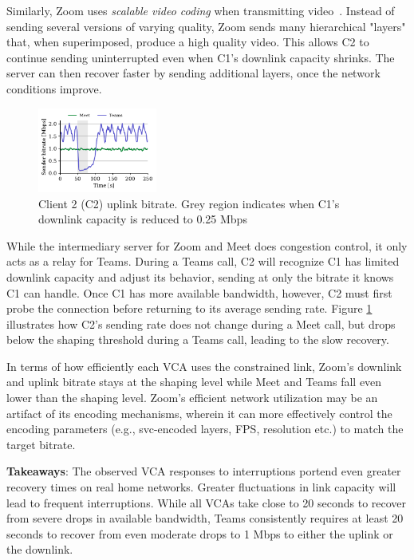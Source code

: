 Similarly, Zoom uses \textit{scalable video coding} when transmitting video~\cite{zoom_encoding}. Instead of sending several versions of varying quality, Zoom sends many hierarchical "layers" that, when superimposed, produce a high quality video. This allows C2 to continue sending uninterrupted even when C1's downlink capacity shrinks. The server can then recover faster by sending additional layers, once the network conditions improve.  

\begin{figure}[t]
    \centering
    \includegraphics[width=0.35\textwidth,keepaspectratio]{../figures/interrupt/Interrupt-sender.pdf}
    \caption{Client 2 (C2) uplink bitrate. Grey region indicates when C1's downlink capacity is reduced to 0.25 Mbps}
    \label{fig:interrupt-sender}
\end{figure}

While the intermediary server for Zoom and Meet does congestion control, it only acts as a relay for Teams. During a Teams call, C2 will recognize C1 has limited downlink capacity and adjust its behavior, sending at only the bitrate it knows C1 can handle. Once C1 has more available bandwidth, however, C2 must first probe the connection before returning to its average sending rate. Figure \ref{fig:interrupt-sender} illustrates how C2's sending rate does not change during a Meet call, but drops below the shaping threshold during a Teams call, leading to the slow recovery.

In terms of how efficiently each VCA uses the constrained link, Zoom's downlink and uplink bitrate stays at the shaping level while Meet and Teams fall even lower than the shaping level. Zoom's efficient network utilization may be an artifact of its encoding mechanisms, wherein it can more effectively control the encoding parameters (e.g., svc-encoded layers, FPS, resolution etc.) to match the target bitrate.  

\noindent \textbf{Takeaways}: The observed VCA responses to interruptions portend even greater recovery times on real home networks. Greater fluctuations in link capacity will lead to frequent interruptions. While all VCAs take close to 20 seconds to recover from severe drops in available bandwidth, Teams consistently requires at least 20 seconds to recover from even moderate drops to 1 Mbps to either the uplink or the downlink.






